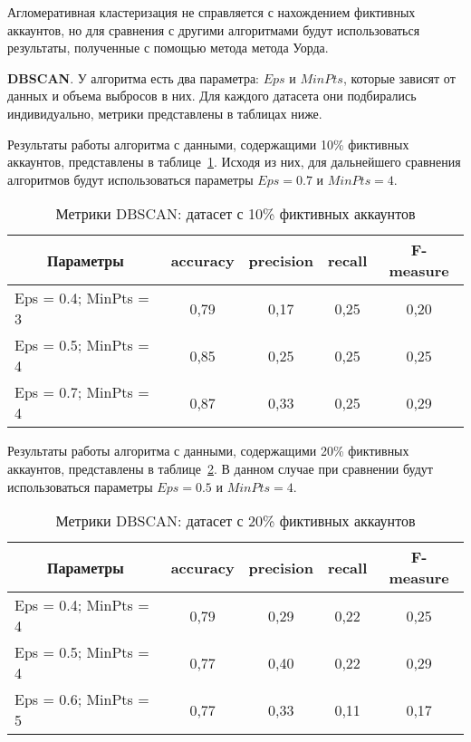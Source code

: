 Агломеративная кластеризация не справляется с нахождением фиктивных аккаунтов, но для сравнения с другими алгоритмами будут использоваться результаты, полученные с помощью метода метода Уорда.

\textbf{DBSCAN}. У алгоритма есть два параметра: $\textit{Eps}$ и $\textit{MinPts}$, которые зависят от данных и объема выбросов в них. Для каждого датасета они подбирались индивидуально, метрики представлены в таблицах ниже. 

Результаты работы алгоритма с данными, содержащими 10\% фиктивных аккаунтов, представлены в таблице~\ref{tabular:DBSCAN2}. Исходя из них, для дальнейшего сравнения алгоритмов будут использоваться параметры $Eps = 0.7$ и $MinPts = 4$.

\begin{table}[H]
    \caption{Метрики DBSCAN: датасет с 10\% фиктивных аккаунтов}
    \vspace{1em}
    \small
    \begin{tabular}{|l|c|c|c|c|}
    \hline
    \multicolumn{1}{|c|}{\textbf{Параметры}} & \textbf{accuracy} & \textbf{precision} & \textbf{recall} & \textbf{F-measure} \\ \hline
    Eps = 0.4; MinPts = 3 & 0,79 & 0,17 & 0,25 & 0,20 \\ \hline
    Eps = 0.5; MinPts = 4 & 0,85 & 0,25 & 0,25 & 0,25 \\ \hline
    Eps = 0.7; MinPts = 4 & 0,87 & 0,33 & 0,25 & 0,29 \\ \hline
    \end{tabular}
    \label{tabular:DBSCAN2}
\end{table}

Результаты работы алгоритма с данными, содержащими 20\% фиктивных аккаунтов, представлены в таблице~\ref{tabular:DBSCAN3}. В данном случае при сравнении будут использоваться параметры $Eps = 0.5$ и $MinPts = 4$.

\begin{table}[H]
    \caption{Метрики DBSCAN: датасет с 20\% фиктивных аккаунтов}
    \vspace{1em}
    \small
    \begin{tabular}{|l|c|c|c|c|}
    \hline
    \multicolumn{1}{|c|}{\textbf{Параметры}} & \textbf{accuracy} & \textbf{precision} & \textbf{recall} & \textbf{F-measure} \\ \hline
    Eps = 0.4; MinPts = 4 & 0,79 & 0,29 & 0,22 & 0,25 \\ \hline
    Eps = 0.5; MinPts = 4 & 0,77 & 0,40 & 0,22 & 0,29 \\ \hline
    Eps = 0.6; MinPts = 5 & 0,77 & 0,33 & 0,11 & 0,17 \\ \hline
    \end{tabular}
    \label{tabular:DBSCAN3}
\end{table}

